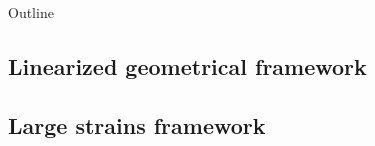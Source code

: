 \begin{frame}[plain]{Outline}
\end{frame}


\subsection{Linearized geometrical framework}

\subsection{Large strains framework}




